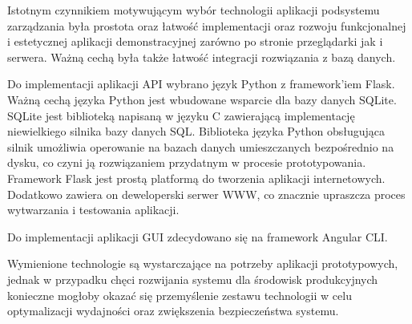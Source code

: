        	Istotnym czynnikiem motywującym wybór technologii aplikacji podsystemu zarządzania była prostota oraz łatwość implementacji oraz rozwoju funkcjonalnej i estetycznej aplikacji demonstracyjnej zarówno po stronie przeglądarki jak i serwera. Ważną cechą była także łatwość integracji rozwiązania z bazą danych. 

		Do implementacji aplikacji API wybrano język Python z framework'iem Flask. Ważną cechą języka Python jest wbudowane wsparcie dla bazy danych SQLite. SQLite jest biblioteką napisaną w języku C zawierającą implementację niewielkiego silnika bazy danych SQL. Biblioteka języka Python obsługująca silnik umożliwia operowanie na bazach danych umieszczanych bezpośrednio na dysku, co czyni ją rozwiązaniem przydatnym w procesie prototypowania. Framework Flask jest prostą platformą do tworzenia aplikacji internetowych. Dodatkowo zawiera on deweloperski serwer WWW, co znacznie upraszcza proces wytwarzania i testowania aplikacji.

		Do implementacji aplikacji GUI zdecydowano się na framework Angular CLI.

		Wymienione technologie są wystarczające na potrzeby aplikacji prototypowych, jednak w przypadku chęci rozwijania systemu dla środowisk produkcyjnych konieczne mogłoby okazać się przemyślenie zestawu technologii w celu optymalizacji wydajności oraz zwiększenia bezpieczeństwa systemu.
